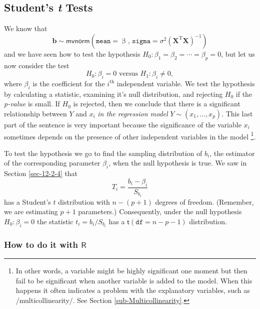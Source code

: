 \documentclass[captions=tableheading]{scrbook}
\begin{document}
\subsection{Student's \emph{t} Tests}
\label{sec-12-3-3}
\label{sub-mlr-Student's-t-Tests}


We know that
\begin{equation}
\mathbf{b}\sim\mathsf{mvnorm}\left(\mathtt{mean}=\upbeta,\,\mathtt{sigma}=\sigma^{2}\left(\mathbf{X}^{\mathrm{T}}\mathbf{X}\right)^{-1}\right)
\end{equation}
and we have seen how to test the hypothesis \(H_{0}:\beta_{1}=\beta_{2}=\cdots=\beta_{p}=0\), but let us now consider the test
\begin{equation}
H_{0}:\beta_{i}=0\mbox{ versus }H_{1}:\beta_{i}\neq0,
\end{equation}
where \(\beta_{i}\) is the coefficient for the \(i^{\textrm{th}}\) independent variable. We test the hypothesis by calculating a statistic, examining it's null distribution, and rejecting \(H_{0}\) if the \emph{p-value} is small. If \(H_{0}\) is rejected, then we conclude that there is a significant relationship between \(Y\) and \(x_{i}\) \emph{in the regression model} \(Y\sim(x_{1},\ldots,x_{p})\). This last part of the sentence is very important because the significance of the variable \(x_{i}\) sometimes depends on the presence of other independent variables in the model
\footnote{In other words, a variable might be highly significant one moment but then fail to be significant when another variable is added to the model. When this happens it often indicates a problem with the explanatory variables, such as /multicollinearity/. See Section \ref{sub-Multicollinearity}.}.

To test the hypothesis we go to find the sampling distribution of \( b_{i} \), the estimator of the corresponding parameter \( \beta_{i} \), when the null hypothesis is true. We saw in Section \ref{sec-12-2-4} that 
\begin{equation}
T_{i}=\frac{b_{i}-\beta_{i}}{S_{b_{i}}}
\end{equation}
has a Student's \(t\) distribution with \(n-(p+1)\) degrees of freedom. (Remember, we are estimating \(p+1\) parameters.) Consequently, under the null hypothesis \(H_{0}:\beta_{i}=0\) the statistic \(t_{i}=b_{i}/S_{b_{i}}\) has a \(\mathsf{t}(\mathtt{df}=n-p-1)\) distribution.
\subsubsection{How to do it with \(\mathsf{R}\)}
\label{sec-12-3-3-1}
\end{document}
